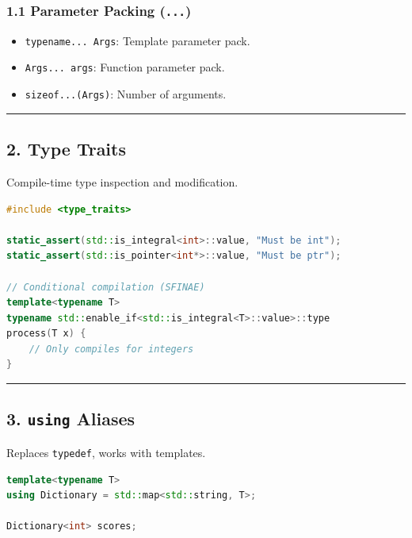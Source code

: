 \hypertarget{parameter-packing-...}{%
\subsubsection{\texorpdfstring{1.1 Parameter Packing
(\texttt{...})}{1.1 Parameter Packing (...)}}\label{parameter-packing-...}}

\begin{itemize}
\tightlist
\item
  \passthrough{\lstinline!typename... Args!}: Template parameter pack.
\item
  \passthrough{\lstinline!Args... args!}: Function parameter pack.
\item
  \passthrough{\lstinline!sizeof...(Args)!}: Number of arguments.
\end{itemize}

\begin{center}\rule{0.5\linewidth}{0.5pt}\end{center}

\hypertarget{type-traits}{%
\subsection{2. Type Traits}\label{type-traits}}

Compile-time type inspection and modification.

\begin{lstlisting}[language={C++}]
#include <type_traits>

static_assert(std::is_integral<int>::value, "Must be int");
static_assert(std::is_pointer<int*>::value, "Must be ptr");

// Conditional compilation (SFINAE)
template<typename T>
typename std::enable_if<std::is_integral<T>::value>::type
process(T x) {
    // Only compiles for integers
}
\end{lstlisting}

\begin{center}\rule{0.5\linewidth}{0.5pt}\end{center}

\hypertarget{using-aliases}{%
\subsection{\texorpdfstring{3. \texttt{using}
Aliases}{3. using Aliases}}\label{using-aliases}}

Replaces \passthrough{\lstinline!typedef!}, works with templates.

\begin{lstlisting}[language={C++}]
template<typename T>
using Dictionary = std::map<std::string, T>;

Dictionary<int> scores;
\end{lstlisting}

